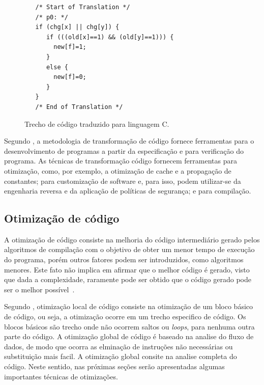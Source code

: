 \begin{figure}[thp]
\caption{\label{fig:cod_c} Trecho de código traduzido para linguagem C.}
	\begin{center}
    \begin{minipage}{0.9\textwidth}
    \begin{lstlisting}       
   /* Start of Translation */
   /* p0: */
   if (chg[x] || chg[y]) {
      if (((old[x]==1) && (old[y]==1))) {
      	new[f]=1;
      }
      else {
      	new[f]=0;
      }
   }
   /* End of Translation */

	\end{lstlisting}
    \end{minipage}
	\end{center}
\end{figure}

\par
Segundo , a metodologia de transformação de código fornece ferramentas para o desenvolvimento de programas a partir da especificação e para verificação do programa. As técnicas de transformação código fornecem ferramentas para otimização, como, por exemplo, a otimização de cache\cite{jin2001theoretical} e a propagação de constantes\cite{kildall1973unified}; para customização de software e, para isso, podem utilizar-se da engenharia reversa\cite{yang1997reverse} e da aplicação de políticas de segurança\cite{erlingsson2000sasi}; e para compilação.

\subsection{Otimização de código}
\par
A otimização de código consiste na melhoria do código intermediário gerado pelos algoritmos de compilação com o objetivo de obter um menor tempo de execução do programa, porém outros fatores podem ser introduzidos, como algoritmos menores. Este fato não implica em afirmar que o melhor código é gerado, visto que dada a complexidade, raramente pode ser obtido que o código gerado pode ser o melhor possível~\cite{aho2007compilers}.

\par
Segundo , otimização local de código consiste na otimização de um bloco básico de código, ou seja, a otimização ocorre em um trecho especifico de código. Os blocos básicos são trecho onde não ocorrem saltos ou \textit{loops}, para nenhuma outra parte do código. A otimização global de código é baseado na analise do fluxo de dados, de modo que ocorra as elminação de instruções não necessárias ou substituição mais facil. A otimização global consite na analise completa do código. Neste sentido, nas próximas seções serão apresentadas algumas importantes técnicas de otimizações.

